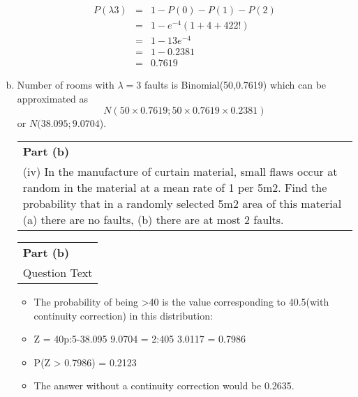 \documentclass[a4paper,12pt]{article}
\begin{document}
\begin{enumerate}[(a)]
\begin{eqnarray*}
P({\lambda} 3) &=& 1 - P(0) - P(1) - P(2)\\
&=& 1 - e^{-4}(1 + 4 + 42 2! )\\
&=& 1 - 13e^{-4}\\
&=& 1 - 0.2381 \\
&=& 0.7619
\end{eqnarray*}
\item Number of rooms with ${\lambda} = 3$ faults is Binomial(50,0.7619) which can be approximated as
\[N(50 \times  0.7619; 50 \times  0.7619 \times  0.2381)\] or $N(38.095; 9.0704$). 
\begin{table}[ht!]
     \centering
     \begin{tabular}{|p{15cm}|}
     \hline        
 \noindent \textbf{Part (b)}\\
\noindent(iv) In the manufacture of curtain material, small flaws occur at random in the material at a mean rate of 1 per 5m2.  Find the probability that in a randomly selected 5m2 area of this material
(a) there are no faults,
(b) there are at most 2 faults.
\\ \hline
 \end{tabular}
\end{table}
\begin{table}[ht!]
     \centering
     \begin{tabular}{|p{15cm}|}
     \hline        
 \noindent \textbf{Part (b)}\\
\noindent Question Text

\\ \hline
 \end{tabular}
\end{table} 
\begin{itemize}
\item The probability of being >40 is the
value corresponding to 40.5(with continuity correction) in this distribution:
\item Z = 40p:5-38.095
9.0704
= 2:405
3.0117 = 0.7986
\item P(Z > 0.7986) = 0.2123
\item The answer without a continuity correction would be 0.2635.
\end{itemize}
\end{enumerate}
\end{document}
